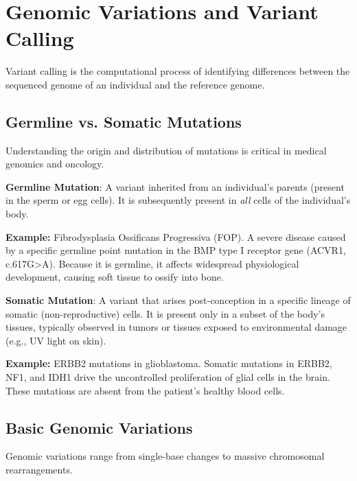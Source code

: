 \documentclass[11pt,a4paper]{article}
\newenvironment{important}{
    \vspace{1em}
    \begin{tcolorbox}[colback=blue!5!white, colframe=blue!75!black, boxrule=1pt, arc=4pt, left=10pt, right=10pt, top=10pt, bottom=10pt]
}{
    \end{tcolorbox}
    \vspace{1em}
}
\begin{document}
\section{Genomic Variations and Variant Calling}
Variant calling is the computational process of identifying differences between the sequenced genome of an individual and the reference genome. 

\subsection{Germline vs. Somatic Mutations}
Understanding the origin and distribution of mutations is critical in medical genomics and oncology.

\begin{important}
  \textbf{Germline Mutation}: A variant inherited from an individual's parents (present in the sperm or egg cells). It is subsequently present in \textit{all} cells of the individual's body.
\end{important}
\textbf{Example:} Fibrodysplasia Ossificans Progressiva (FOP). 
A severe disease caused by a specific germline point mutation in the BMP type I receptor gene (ACVR1, c.617G>A). Because it is germline, it affects widespread physiological development, causing soft tissue to ossify into bone.

\begin{important}
  \textbf{Somatic Mutation}: A variant that arises post-conception in a specific lineage of somatic (non-reproductive) cells. It is present only in a subset of the body's tissues, typically observed in tumors or tissues exposed to environmental damage (e.g., UV light on skin).
\end{important}
\textbf{Example:} ERBB2 mutations in glioblastoma. 
Somatic mutations in ERBB2, NF1, and IDH1 drive the uncontrolled proliferation of glial cells in the brain. These mutations are absent from the patient's healthy blood cells.

\subsection{Basic Genomic Variations}
Genomic variations range from single-base changes to massive chromosomal rearrangements. 
\end{document}
